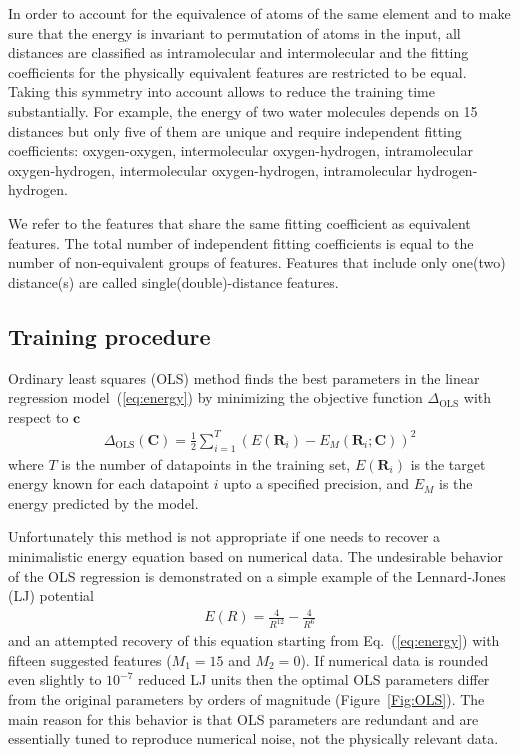 \documentclass[aip,jcp,reprint,amsmath,amssymb,nature]{revtex4-1}
\begin{document}
In order to account for the equivalence of atoms of the same element and to make sure that the energy is invariant to permutation of atoms in the input, all distances are classified as intramolecular and intermolecular and the fitting coefficients for the physically equivalent features are restricted to be equal. 
Taking this symmetry into account allows to reduce the training time substantially. 
For example, the energy of two water molecules depends on 15 distances but only five of them are unique and require independent fitting coefficients: oxygen-oxygen, intermolecular oxygen-hydrogen, intramolecular oxygen-hydrogen, intermolecular oxygen-hydrogen, intramolecular hydrogen-hydrogen.

We refer to the features that share the same fitting coefficient as equivalent features. The total number of independent fitting coefficients is equal to the number of non-equivalent groups of features. Features that include only one(two) distance(s) are called single(double)-distance features.

\subsection{Training procedure} 

Ordinary least squares (OLS) method finds the best parameters in the linear regression model~(\ref{eq:energy}) by minimizing the objective function $\Delta_{\text{OLS}}$ with respect to $\mathbf{c}$
%
\begin{eqnarray}
\Delta_{\text{OLS}}(\mathbf{C}) = \frac{1}{2} \sum_{i=1}^{T} \left( E(\mathbf{R}_{i}) -  E_M (\mathbf{R}_{i}; \mathbf{C}) \right)^2 \label{eq:OF-OLS}
\end{eqnarray}
%
where $T$ is the number of datapoints in the training set, $E(\mathbf{R}_{i})$ is the target energy known for each datapoint $i$ upto a specified precision, and $E_M$ is the energy predicted by the model.

Unfortunately this method is not appropriate if one needs to recover a minimalistic energy equation based on numerical data. The undesirable behavior of the OLS regression is demonstrated on a simple example of the Lennard-Jones (LJ) potential
%
\begin{eqnarray}
E (R) = \frac{4}{R^{12}} - \frac{4}{R^{6}} \label{eq:LJenergy}
\end{eqnarray}
%
and an attempted recovery of this equation starting from Eq.~(\ref{eq:energy}) with fifteen suggested features ($M_1=15$ and $M_2=0$). If numerical data is rounded even slightly to $10^{-7}$ reduced LJ units then the optimal OLS parameters differ from the original parameters by orders of magnitude (Figure~\ref{Fig:OLS}). The main reason for this behavior is that OLS parameters are redundant and are essentially tuned to reproduce numerical noise, not the physically relevant data.
\end{document}
